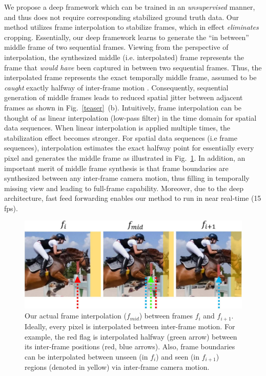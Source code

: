 We propose a deep framework which can be trained in an \emph{unsupervised} manner, and thus does not require corresponding stabilized ground truth data.
Our method utilizes frame interpolation to stabilize frames, which in effect \emph{eliminates} cropping.
Essentially, our deep framework learns to generate the ``in between'' middle frame of two sequential frames.
Viewing from the perspective of interpolation, the synthesized middle (i.e. interpolated) frame represents the frame that \emph{would have} been captured in between two sequential frames.
Thus, the interpolated frame represents the exact temporally middle frame, assumed to be \emph{caught} exactly halfway of inter-frame motion \cite{niklaus2017adaptive,niklaus2018context}.
Consequently, sequential generation of middle frames leads to reduced spatial jitter between adjacent frames as shown in Fig.~\ref{teaser}~(b).
Intuitively, frame interpolation can be thought of as linear interpolation (low-pass filter) in the time domain for spatial data sequences. 
When linear interpolation is applied multiple times, the stabilization effect becomes stronger.
For spatial data sequences (i.e frame sequences), interpolation estimates the exact halfway point for essentially every pixel and generates the middle frame as illustrated in Fig.~\ref{interpolation}.
In addition, an important merit of middle frame synthesis is that frame boundaries are synthesized between any inter-frame camera motion, thus filling in temporally missing view and leading to full-frame capability.
Moreover, due to the deep architecture, fast feed forwarding enables our method to run in near real-time (15 fps).

\begin{figure}
	\includegraphics[width=1\linewidth,keepaspectratio]{interpolation}
	\caption{Our actual frame interpolation ($f_{mid}$) between frames $f_i$ and $f_{i+1}$.
	Ideally, every pixel is interpolated between inter-frame motion.
	For example, the red flag is interpolated halfway (green arrow) between its inter-frame positions (red, blue arrows).
	Also, frame boundaries can be interpolated between unseen (in $f_i$) and seen (in $f_{i+1}$) regions (denoted in yellow) via inter-frame camera motion.}
	\label{interpolation}
	\vspace{-5mm}
\end{figure}


